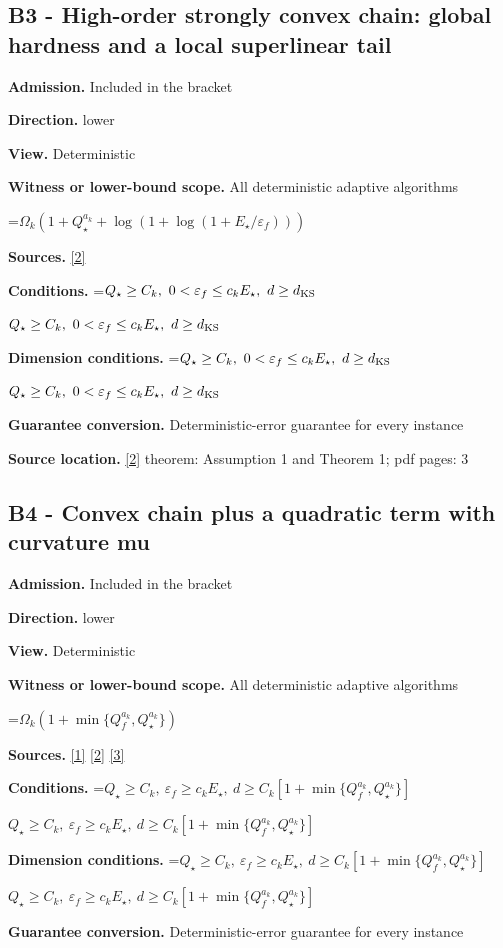 \documentclass[10pt,a4paper]{article}
\newcommand{\AtlasMath}[1]{\par\begingroup\centering\setbox0=\hbox{$\displaystyle #1$}\ifdim\wd0>1.4\linewidth\typeout{ATLAS WIDE FORMULA: \the\wd0}\fi\ifdim\wd0>\linewidth\resizebox{\linewidth}{!}{\box0}\else\box0\fi\par\endgroup}
\newcommand{\AtlasInlineMath}[1]{\begingroup\setbox0=\hbox{$#1$}\ifdim\wd0>.4\linewidth\endgroup\AtlasMath{#1}\else\endgroup$#1$\fi}
\begin{document}
\subsection{B3 - High-order strongly convex chain: global hardness and a local superlinear tail}
\textbf{Admission.} Included in the bracket

\textbf{Direction.} lower

\textbf{View.} Deterministic

\textbf{Witness or lower-bound scope.} All deterministic adaptive algorithms

\AtlasMath{\Omega_k(1+Q_\star^{a_k}+\log(1+\log(1+E_\star/\varepsilon_f)))}
\textbf{Sources.} \href{https://arxiv.org/pdf/2010.06642v2}{[2]}

\textbf{Conditions.} \AtlasInlineMath{Q_\star\ge C_k,\ 0<\varepsilon_f\le c_k E_\star,\ d\ge d_{\rm KS}}

\textbf{Dimension conditions.} \AtlasInlineMath{Q_\star\ge C_k,\ 0<\varepsilon_f\le c_k E_\star,\ d\ge d_{\rm KS}}

\textbf{Guarantee conversion.} Deterministic-error guarantee for every instance

\textbf{Source location.} \href{https://arxiv.org/pdf/2010.06642v2}{[2]} theorem: Assumption 1 and Theorem 1; pdf pages: 3

\subsection{B4 - Convex chain plus a quadratic term with curvature mu}
\textbf{Admission.} Included in the bracket

\textbf{Direction.} lower

\textbf{View.} Deterministic

\textbf{Witness or lower-bound scope.} All deterministic adaptive algorithms

\AtlasMath{\Omega_k(1+\min\{Q_f^{a_k},Q_\star^{a_k}\})}
\textbf{Sources.} \href{https://arxiv.org/pdf/2205.09647v1}{[1]} \href{https://arxiv.org/pdf/2010.06642v2}{[2]} \href{https://arxiv.org/pdf/1705.07260v2}{[3]}

\textbf{Conditions.} \AtlasInlineMath{Q_\star\ge C_k,\ \varepsilon_f\ge c_kE_\star,\ d\ge C_k[1+\min\{Q_f^{a_k},Q_\star^{a_k}\}]}

\textbf{Dimension conditions.} \AtlasInlineMath{Q_\star\ge C_k,\ \varepsilon_f\ge c_kE_\star,\ d\ge C_k[1+\min\{Q_f^{a_k},Q_\star^{a_k}\}]}

\textbf{Guarantee conversion.} Deterministic-error guarantee for every instance
\end{document}
